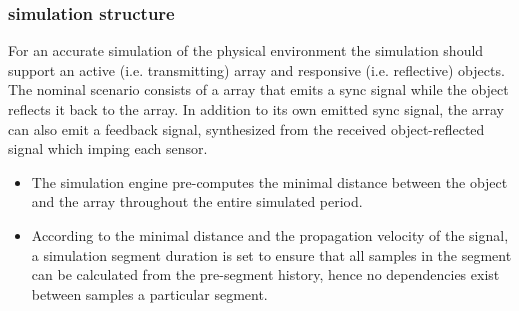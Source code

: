 \documentclass[12pt]{article}
\begin{document}
\subsubsection{simulation structure}
For an accurate simulation of the physical environment the simulation should support an active (i.e. transmitting) array and responsive (i.e. reflective) objects. The nominal scenario consists of a array that emits a sync signal while the object reflects it back to the array. In addition to its own emitted sync signal, the array can also emit a feedback signal, synthesized from the received object-reflected signal which imping each sensor. 
\begin{itemize}
\item{
The simulation engine pre-computes the minimal distance between the object and the array throughout the entire simulated period.
}
\item{
According to the minimal distance and the propagation velocity of the signal, a simulation segment duration is set to ensure that all samples in the segment can be calculated from the pre-segment history, hence no dependencies exist between samples a particular segment.
}
\end{itemize}
\end{document}
